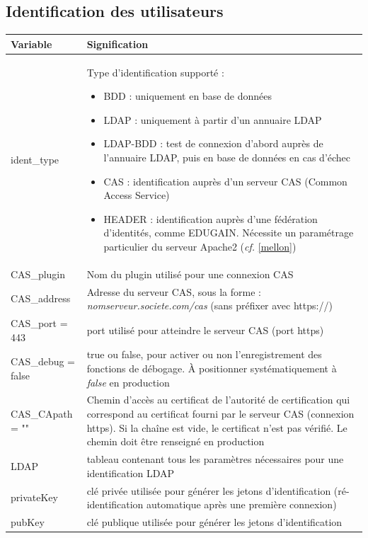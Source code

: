 \subsection{Identification des utilisateurs}

\begin{longtable}{|p{6cm}|p{10cm}|}
\hline
\textbf{Variable} & \textbf{Signification} \\
\hline
\endhead
ident\_type & Type d'identification supporté :
\begin{itemize}
	\item BDD : uniquement en base de données
	\item LDAP : uniquement à partir d'un annuaire LDAP
	\item LDAP-BDD : test de connexion d'abord auprès de l'annuaire LDAP, puis en base de données en cas d'échec
	\item CAS : identification auprès d'un serveur CAS (Common Access Service)
	\item HEADER : identification auprès d'une fédération d'identités, comme EDUGAIN. Nécessite un paramétrage particulier du serveur Apache2 (\textit{cf.} \ref{mellon})
\end{itemize}
\\
\hline
CAS\_plugin & Nom du plugin utilisé pour une connexion CAS \\
\hline
CAS\_address & Adresse du serveur CAS, sous la forme : \textit{nomserveur.societe.com/cas} (sans préfixer avec https://)\\
\hline
CAS\_port = 443 & port utilisé pour atteindre le serveur CAS (port https)\\
\hline
CAS\_debug = false & true ou false, pour activer ou non l'enregistrement des fonctions de débogage. À positionner systématiquement à \textit{false} en production \\
\hline
CAS\_CApath = "" & Chemin d'accès au certificat de l'autorité de certification qui correspond au certificat fourni par le serveur CAS (connexion https). Si la chaîne est vide, le certificat n'est pas vérifié. Le chemin doit être renseigné en production \\
\hline
LDAP & tableau contenant tous les paramètres nécessaires pour une identification LDAP \\
\hline
privateKey & clé privée utilisée pour générer les jetons d'identification (ré-identification automatique après une première connexion) \\
\hline
pubKey & clé publique utilisée pour générer les jetons d'identification \\

\end{longtable}
